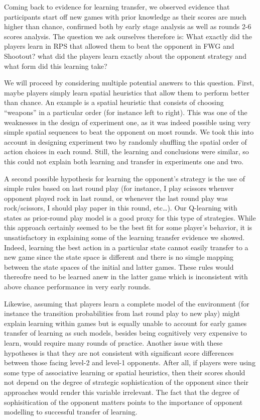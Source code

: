 \documentclass[man,floatsintext]{apa6}
\begin{document}
Coming back to evidence for learning transfer, we observed evidence that participants start off new games with prior knowledge as their scores are much higher than chance, confirmed both by early stage analysis as well as rounds 2-6 scores analysis. The question we ask ourselves therefore is: What exactly did the players learn in RPS that allowed them to beat the opponent in FWG and Shootout? what did the players learn exactly about the opponent strategy and what form did this learning take?

We will proceed by considering multiple potential answers to this question. First, maybe players simply learn spatial heuristics that allow them to perform better than chance. An example is a spatial heuristic that consists of choosing \enquote{weapons} in a particular order (for instance left to right). This was one of the weaknesses in the design of experiment one, as it was indeed possible using very simple spatial sequences to beat the opponent on most rounds. We took this into account in designing experiment two by randomly shuffling the spatial order of action choices in each round. Still, the learning and conclusions were similar, so this could not explain both learning and transfer in experiments one and two.

A second possible hypothesis for learning the opponent's strategy is the use of simple rules based on last round play (for instance, I play scissors whenver opponent played rock in last round, or whenever the last round play was rock/scissors, I should play paper in this round, etc\ldots{}). Our Q-learning with states as prior-round play model is a good proxy for this type of strategies. While this approach certainly seemed to be the best fit for some player's behavior, it is unsatisfactory in explaining some of the learning transfer evidence we showed. Indeed, learning the best action in a particular state cannot easily transfer to a new game since the state space is different and there is no simgle mapping between the state spaces of the initial and latter games. These rules would thereofre need to be learned anew in the latter game which is inconsistent with above chance performance in very early rounds.

Likewise, assuming that players learn a complete model of the environment (for instance the transition probabilities from last round play to new play) might explain learning within games but is equally unable to account for early games transfer of learning as such models, besides being cognitively very expensive to learn, would require many rounds of practice. Another issue with these hypotheses is that they are not consistent with significant score differences between those facing level-2 and level-1 opponents. After all, if players were using some type of associative learning or spatial heuristics, then their scores should not depend on the degree of strategic sophistication of the opponent since their approaches would render this variable irrelevant. The fact that the degree of sophisitication of the opponent matters points to the importance of opponent modelling to successful transfer of learning.
\end{document}
